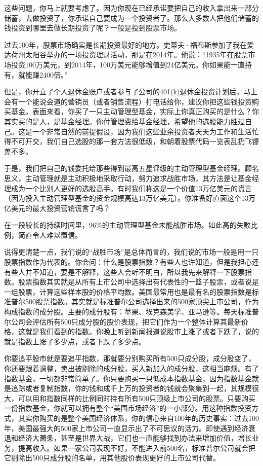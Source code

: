 这些问题，你马上就要考虑了。因为你现在已经承诺要把自己的收入拿出来一部分储蓄，去做投资了，你承诺自己要成为一个投资者了。那么大多数人把他们储蓄的钱投资到哪里去做长期投资了呢？一般是投到股票市场。

过去100年，股票市场确实是长期投资最好的地方。史蒂夫·福布斯参加了我在爱达荷州太阳谷举办的一场投资理财活动，那是在2014年。他说：“1935年在股票市场投资100万美元，到2014年，100万美元能够增值到24亿美元。你如果能一直持有，就能赚2400倍。”

但是，你开立了个人退休金账户或者参与了公司的401(k)退休金投资计划后，马上会有一个能说会道的营销员（或者销售流程）打电话给你，建议你把这些钱投资购买基金。表面来看，你买了一只主动管理型基金，实际上你真正购买的是什么？你其实买的是人，是基金经理。你付管理费给基金经理，希望他的选股能力胜过自己。这是一个非常自然的前提假设，因为我们这些业余投资者天天为工作和生活忙得不可开交，我们自己选股的那一套方法很低级，和朝着股票代码一览表乱扔飞镖差不多。

于是，我们把自己的钱委托给那些得到最高五星评级的主动管理型基金经理。顾名思义，主动管理就是主动积极地采取行动，努力追求战胜市场，其方法是让基金经理成为一个比别人更好的选股高手。有时我们称这是一个价值13万亿美元的谎言（因为投入主动管理型基金的资金规模高达13万亿美元）。你准备好直面这个13万亿美元的最大投资营销谎言了吗？

在一段较长的持续时间里，96\%的主动管理型基金未能战胜市场。如此高的失败比例，简直令人难以置信。

说得更清楚一点，我们说的“战胜市场”是总体而言的，我们说的市场一般是用一只股票指数作为代表的。你会问：什么是股票指数？有些人也许知道，但是我担心还有些人并不知道，要是不解释，这些人会听不明白，所以我先来解释一下股票指数。股票指数其实就是从所有上市公司中选择出有代表性的一篮子股票，或者说是一组股票，计算这些样本股的价格平均数。美国最常用也是最有名的股票指数是标准普尔500股票指数。其实就是标准普尔公司选择出来的500家顶尖上市公司，作为构成指数的成分股。主要的成分股有：苹果、埃克森美孚、亚马逊等。每天标准普尔公司会评估所有500只成分股的股价表现，把它们作为一个整体计算其最新价格，这就是我们看到的指数。你晚上听到新闻报道说股市上涨了或者下跌了，说的就是指数上涨了多少点，或者下跌了多少点。

你要追平股市就是要追平指数，那就要分别购买所有500只成分股，成分股变了，你还要跟着调整，卖出被剔除的成分股，买入新加入的成分股，这相当麻烦。有了指数基金，一切都非常简单了。你只要购买一只低成本指数基金，因为指数基金就是追踪或者复制指数，你的钱和成千上万的投资者的钱就会聚集到一起，其规模很大，可以用和指数同样的比例同时持有所有500只顶级上市公司的股票。只要购买一份指数基金，你就可以拥有整个“美国市场经济”的一小部分。用这种指数投资方式，其实你购买的是整个美国经济体系，你的信心来自100年的历史事实：过去100年，美国最强大的500家上市公司一直显示出了不可思议的活力。即使遇到经济衰退和经济大萧条，甚至是世界大战，它们也一直能够找到办法来增加价值，增长业务，提高收入。如果一家公司表现不好，不能进入前500名，标准普尔公司就会把它剔除出500只成分股的名单，用其他股价表现更好的上市公司代替。

